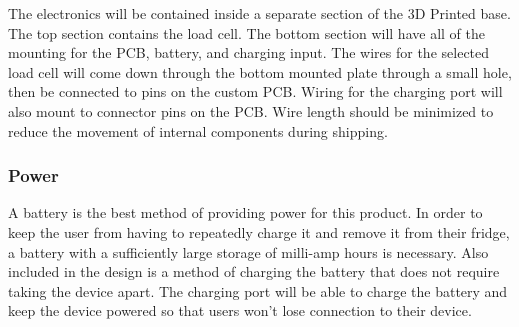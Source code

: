 The electronics will be contained inside a separate section of the 3D Printed base. The top section contains the load cell. The bottom section will have all of the mounting for the PCB, battery, and charging input. The wires for the selected load cell will come down through the bottom mounted plate through a small hole, then be connected to pins on the custom PCB. Wiring for the charging port will also mount to connector pins on the PCB. Wire length should be minimized to reduce the movement of internal components during shipping. 

\subsubsection{Power}

A battery is the best method of providing power for this product. In order to keep the user from having to repeatedly charge it and remove it from their fridge, a battery with a sufficiently large storage of milli-amp hours is necessary. Also included in the design is a method of charging the battery that does not require taking the device apart. The charging port will be able to charge the battery and keep the device powered so that users won't lose connection to their device.


